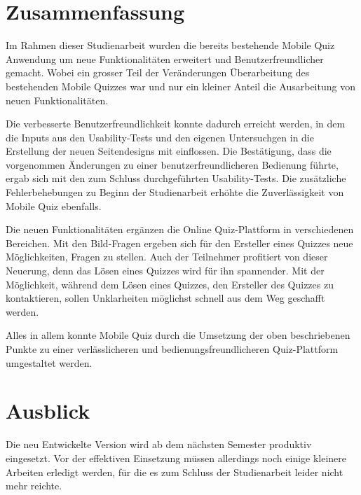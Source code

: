 
\section{Zusammenfassung}
Im Rahmen dieser Studienarbeit wurden die bereits bestehende Mobile Quiz Anwendung um neue Funktionalitäten erweitert und Benutzerfreundlicher gemacht. Wobei ein grosser Teil der Veränderungen Überarbeitung des bestehenden Mobile Quizzes war und nur ein kleiner Anteil die Ausarbeitung von neuen Funktionalitäten.

\bigskip

Die verbesserte Benutzerfreundlichkeit konnte dadurch erreicht werden, in dem die Inputs aus den \gls{Usability-Test}s und den eigenen Untersuchgen in die Erstellung der neuen Seitendesigns mit einflossen. Die Bestätigung, dass die vorgenommen Änderungen zu einer benutzerfreundlicheren Bedienung führte, ergab sich mit den zum Schluss durchgeführten \gls{Usability-Test}s. Die zusätzliche Fehlerbehebungen zu Beginn der Studienarbeit erhöhte die Zuverlässigkeit von Mobile Quiz ebenfalls.

\bigskip

Die neuen Funktionalitäten ergänzen die Online Quiz-Plattform in verschiedenen Bereichen. Mit den Bild-Fragen ergeben sich für den Ersteller eines Quizzes neue Möglichkeiten, Fragen zu stellen. Auch der Teilnehmer profitiert von dieser Neuerung, denn das Lösen eines Quizzes wird für ihn spannender.
Mit der Möglichkeit, während dem Lösen eines Quizzes, den Ersteller des Quizzes zu kontaktieren, sollen Unklarheiten möglichst schnell aus dem Weg geschafft werden.

\bigskip

Alles in allem konnte Mobile Quiz durch die Umsetzung der oben beschriebenen Punkte zu einer verlässlicheren und bedienungsfreundlicheren Quiz-Plattform umgestaltet werden.

\section{Ausblick}
Die neu Entwickelte Version wird ab dem nächsten Semester produktiv eingesetzt. Vor der effektiven Einsetzung müssen allerdings noch einige kleinere Arbeiten erledigt werden, für die es zum Schluss der Studienarbeit leider nicht mehr reichte.

\bigskip

